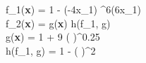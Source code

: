 f_1(\textbf{x}) = 1 - \exp(-4x_1) \sin^6(6\pi x_1) \\
f_2(\textbf{x}) = g(\textbf{x}) h(f_1, g) \\
g(\textbf{x}) = 1 + 9 \left(  \right)^{0.25} \\
h(f_1, g) = 1 - \left(  \right)^2
